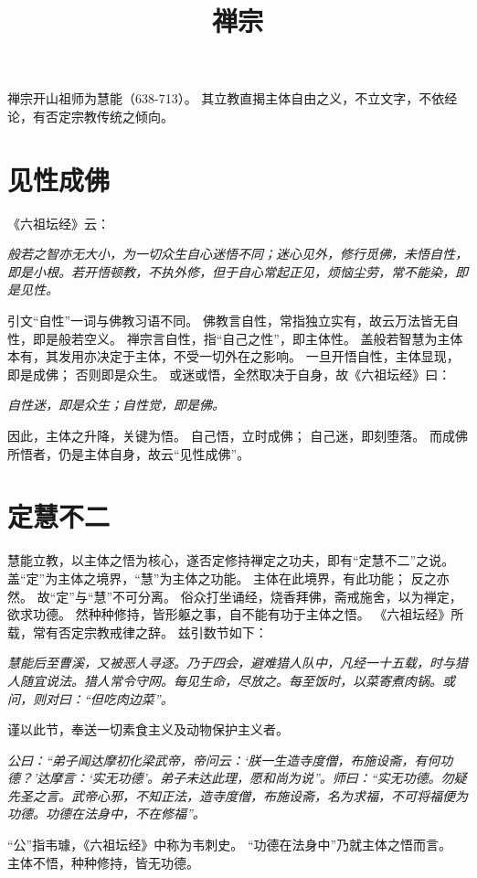 \documentclass[11pt]{article}
\title{禅宗}
\date{}
\begin{document}
  \maketitle

  \linenumbers

禅宗开山祖师为慧能（638-713）。
其立教直揭主体自由之义，不立文字，不依经论，有否定宗教传统之倾向。

\section{见性成佛}
《六祖坛经》云：

\textit{般若之智亦无大小，为一切众生自心迷悟不同；迷心见外，修行觅佛，未悟自性，即是小根。若开悟顿教，不执外修，但于自心常起正见，烦恼尘劳，常不能染，即是见性。}

引文“自性”一词与佛教习语不同。
佛教言自性，常指独立实有，故云万法皆无自性，即是般若空义。
禅宗言自性，指“自己之性”，即主体性。
盖般若智慧为主体本有，其发用亦决定于主体，不受一切外在之影响。
一旦开悟自性，主体显现，即是成佛；
否则即是众生。
或迷或悟，全然取决于自身，故《六祖坛经》曰：

\textit{自性迷，即是众生；自性觉，即是佛。}

因此，主体之升降，关键为悟。
自己悟，立时成佛；
自己迷，即刻堕落。
而成佛所悟者，仍是主体自身，故云“见性成佛”。

\section{定慧不二}
慧能立教，以主体之悟为核心，遂否定修持禅定之功夫，即有“定慧不二”之说。
盖“定”为主体之境界，“慧”为主体之功能。
主体在此境界，有此功能；
反之亦然。
故“定”与“慧”不可分离。
俗众打坐诵经，烧香拜佛，斋戒施舍，以为禅定，欲求功德。
然种种修持，皆形躯之事，自不能有功于主体之悟。
《六祖坛经》所载，常有否定宗教戒律之辞。
兹引数节如下：

\textit{慧能后至曹溪，又被恶人寻逐。乃于四会，避难猎人队中，凡经一十五载，时与猎人随宜说法。猎人常令守网。每见生命，尽放之。每至饭时，以菜寄煮肉锅。或问，则对曰：“但吃肉边菜”。}

谨以此节，奉送一切素食主义及动物保护主义者。

\textit{公曰：“弟子闻达摩初化梁武帝，帝问云：‘朕一生造寺度僧，布施设斋，有何功德？’达摩言：‘实无功德’。弟子未达此理，愿和尚为说”。师曰：“实无功德。勿疑先圣之言。武帝心邪，不知正法，造寺度僧，布施设斋，名为求福，不可将福便为功德。功德在法身中，不在修福”。}

“公”指韦璩，《六祖坛经》中称为韦刺史。
“功德在法身中”乃就主体之悟而言。
主体不悟，种种修持，皆无功德。
\end{document}
